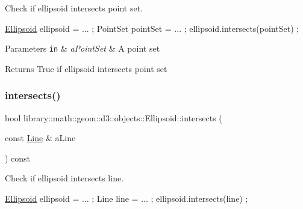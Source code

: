 Check if ellipsoid intersects point set. 


\begin{DoxyCode}
\hyperlink{classlibrary_1_1math_1_1geom_1_1d3_1_1objects_1_1_ellipsoid_aae81fe0edc7f0e8d4590ea89ae73cb14}{Ellipsoid} ellipsoid = ... ;
PointSet pointSet = ... ;
ellipsoid.intersects(pointSet) ;
\end{DoxyCode}



\begin{DoxyParams}[1]{Parameters}
\mbox{\tt in}  & {\em a\+Point\+Set} & A point set \\
\hline
\end{DoxyParams}
\begin{DoxyReturn}{Returns}
True if ellipsoid intersects point set 
\end{DoxyReturn}
\mbox{\label{classlibrary_1_1math_1_1geom_1_1d3_1_1objects_1_1_ellipsoid_a50957c46fca340a2d20e1845f97f9131}} 
\subsubsection{\texorpdfstring{intersects()}{intersects()}\hspace{0.1cm}{\footnotesize\ttfamily [3/9]}}
{\footnotesize\ttfamily bool library\+::math\+::geom\+::d3\+::objects\+::\+Ellipsoid\+::intersects (\begin{DoxyParamCaption}\item[{const \hyperlink{classlibrary_1_1math_1_1geom_1_1d3_1_1objects_1_1_line}{Line} \&}]{a\+Line }\end{DoxyParamCaption}) const}



Check if ellipsoid intersects line. 


\begin{DoxyCode}
\hyperlink{classlibrary_1_1math_1_1geom_1_1d3_1_1objects_1_1_ellipsoid_aae81fe0edc7f0e8d4590ea89ae73cb14}{Ellipsoid} ellipsoid = ... ;
Line line = ... ;
ellipsoid.intersects(line) ;
\end{DoxyCode}




